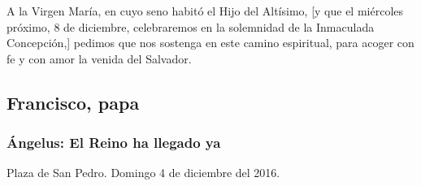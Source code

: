 \begin{body}
	A la Virgen María, en cuyo seno habitó el Hijo del Altísimo, {[}y que el miércoles próximo, 8 de diciembre, celebraremos en la solemnidad de la Inmaculada Concepción,{]} pedimos que nos sostenga en este camino espiritual, para acoger con fe y con amor la venida del Salvador.
\end{body}		

\subsection{Francisco, papa}

\subsubsection{Ángelus: El Reino ha llegado ya}

Plaza de San Pedro. Domingo 4 de diciembre del 2016.

